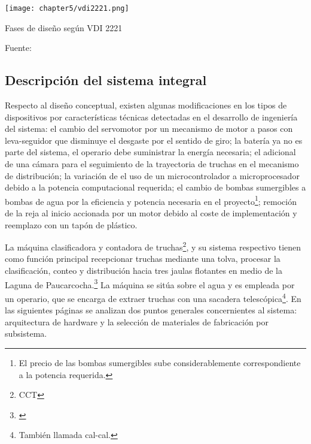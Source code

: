 \begin{myfigure}[H]
	\footnotesize\centering
	\texttt{[image: chapter5/vdi2221.png]}
	\caption{Fases de diseño según VDI 2221}
	\begin{myflushcenter}
		Fuente: \cite{Pahl2007}
	\end{myflushcenter}
	\label{fig:vdi2221}
\end{myfigure}



\subsection{Descripción del sistema integral}
\label{ssec:descripcion del sistema integral}

Respecto al diseño conceptual, existen algunas modificaciones en los tipos de dispositivos por características técnicas detectadas en el desarrollo de ingeniería del sistema: el cambio del servomotor por un mecanismo de motor a pasos con leva-seguidor que disminuye el desgaste por el sentido de giro; la batería ya no es parte del sistema, el operario debe suministrar la energía necesaria; el adicional de una cámara para el seguimiento de la trayectoria de truchas en el mecanismo de distribución; la variación de el uso de un microcontrolador a microprocesador debido a la potencia computacional requerida; el cambio de bombas sumergibles a bombas de agua por la eficiencia y potencia necesaria en el proyecto\footnote{El precio de las bombas sumergibles sube considerablemente correspondiente a la potencia requerida.}; remoción de la reja al inicio accionada por un motor debido al coste de implementación y reemplazo con un tapón de plástico.

La máquina clasificadora y contadora de truchas\footnote{CCT}, y su sistema respectivo tienen como función principal recepcionar truchas mediante una tolva, procesar la clasificación, conteo y distribución hacia tres jaulas flotantes en medio de la Laguna de Paucarcocha.\footnote{\cite{DiazVergara2020}} La máquina se sitúa sobre el agua y es empleada por un operario, que se encarga de extraer truchas con una sacadera telescópica\footnote{También llamada cal-cal.}. En las siguientes páginas se analizan dos puntos generales concernientes al sistema: arquitectura de hardware y la selección de materiales de fabricación por subsistema.


